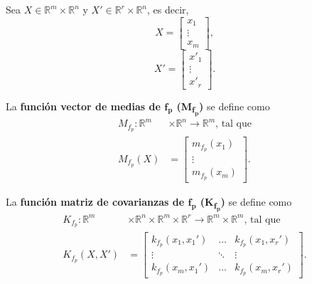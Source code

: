 \begin{defin*}
Sea $X \in \mathbb{R}^m \times \mathbb{R}^n$ y $X' \in \mathbb{R}^r \times \mathbb{R}^n$, es decir,
\begin{equation*}
    X =     
    \left[
        \begin{array}{c}
        x_1  \\
        \vdots \\
        x_m
        \end{array}
    \right],
\end{equation*}
\begin{equation*}
    X' =     
    \left[
        \begin{array}{c}
        x'_1  \\
        \vdots \\
        x'_r
        \end{array}
    \right].
\end{equation*}

La \textbf{función vector de medias de $\bm{f_p}$ (M\textsubscript{$\bm{f_p}$})} se define como
\begin{equation*}
\begin{aligned}
    M_{f_p}: \mathbb{R}^m &\times \mathbb{R}^n \rightarrow \mathbb{R}^m
    \text{, tal que}\\
    M_{f_p}(X) &=     
    \left[
        \begin{array}{c}
        m_{f_p}(x_1)  \\
        \vdots \\
        m_{f_p}(x_m)
        \end{array}
    \right].
\end{aligned}
\end{equation*}

La \textbf{función matriz de covarianzas de $\bm{f_p}$ (K\textsubscript{$\bm{f_p}$})} se define como
\begin{equation*}
\begin{aligned}
    K_{f_p}: \mathbb{R}^m &\times \mathbb{R}^n \times \mathbb{R}^m \times \mathbb{R}^r \rightarrow \mathbb{R}^m \times \mathbb{R}^m
    \text{, tal que}\\
    K_{f_p}(X,X') &=     
    \left[
        \begin{array}{ccc}
        k_{f_p}(x_1,x_1') & ... & k_{f_p}(x_1,x_r')  \\
        \vdots & \ddots & \vdots \\
        k_{f_p}(x_m,x_1') & ... & k_{f_p}(x_m,x_r')
        \end{array}
    \right].
\end{aligned}
\end{equation*}
\end{defin*}


